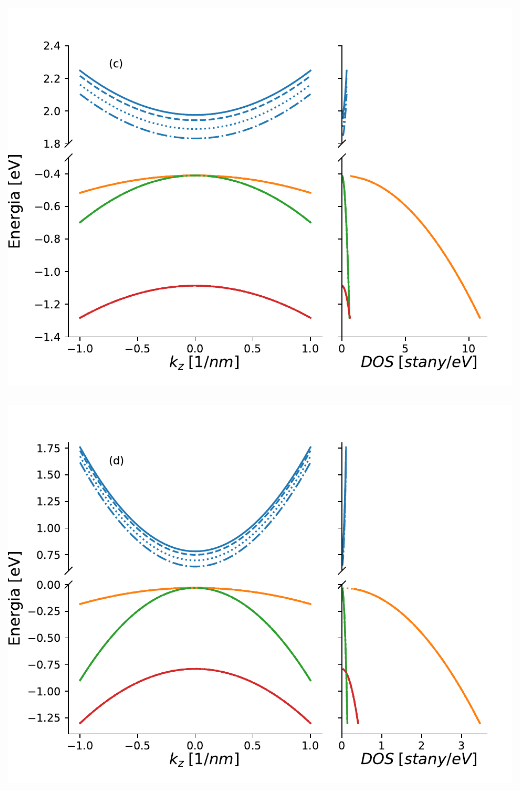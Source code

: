 \documentclass[12pt,openany,a4paper]{book}
\begin{document}
\begin{minipage}[t]{0.5\textwidth}
	\includegraphics[width = 1.05\linewidth]{Figures/band_str/AlSb.pdf}\label{fig:AlSb_bs}
\end{minipage}
\begin{minipage}[t]{0.5\textwidth}
	\includegraphics[width = 1.05\linewidth]{Figures/band_str/GaSb.pdf}\label{fig:GaSb_bs}
\end{minipage}
\begin{center}
\end{center}
\end{document}
